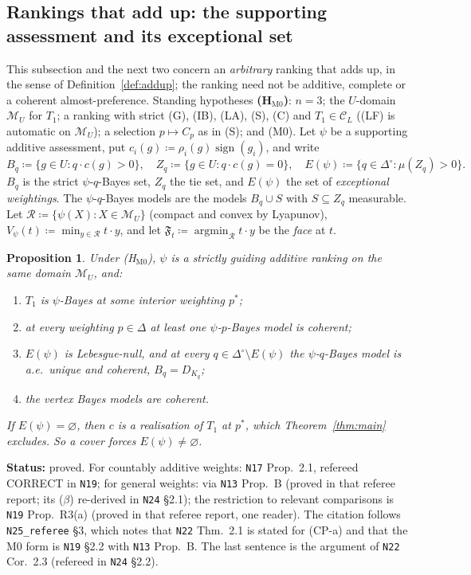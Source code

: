 \documentclass[11pt]{article}
\newtheorem{proposition}[theorem]{Proposition}
\theoremstyle{definition}
\theoremstyle{remark}
\newcommand{\Di}{\Delta^{\circ}}
\newcommand{\M}{\mathcal M}
\newcommand{\C}{\mathcal C}
\newcommand{\src}[1]{\texttt{#1}}
\newcommand{\status}[1]{\par\smallskip\noindent\textbf{Status:} #1\par\smallskip}
\begin{document}
\subsection{Rankings that add up: the supporting assessment and its exceptional set}\label{sec:M0}

This subsection and the next two concern an \emph{arbitrary} ranking that adds up, in the sense of Definition~\ref{def:addup}; the ranking need not be additive, complete or a coherent almost-preference. Standing hypotheses \textbf{(H$_{\mathrm{M0}}$)}: $n=3$; the $U$-domain $\M_U$ for $T_1$; a ranking with strict (G), (IB), (LA), (S), (C) and $T_1\in\C_L$ ((LF) is automatic on $\M_U$); a selection $p\mapsto C_p$ as in (S); and (M0). Let $\psi$ be a supporting additive assessment, put $c_i(g)\coloneqq\rho_i(g)\operatorname{sign}(g_i)$, and write
\[
B_q\coloneqq\{g\in U:q\cdot c(g)>0\},\quad Z_q\coloneqq\{g\in U:q\cdot c(g)=0\},\quad E(\psi)\coloneqq\{q\in\Di:\mu(Z_q)>0\}.
\]
$B_q$ is the strict $\psi$-$q$-Bayes set, $Z_q$ the tie set, and $E(\psi)$ the set of \emph{exceptional weightings}. The $\psi$-$q$-Bayes models are the models $B_q\cup S$ with $S\subseteq Z_q$ measurable. Let $\mathcal R\coloneqq\{\psi(X):X\in\M_U\}$ (compact and convex by Lyapunov), $V_\psi(t)\coloneqq\min_{y\in\mathcal R}t\cdot y$, and let $\mathfrak F_t\coloneqq\operatorname{argmin}_{\mathcal R}t\cdot y$ be the \emph{face} at $t$.

\begin{proposition}\label{prop:M0}
Under (H$_{\mathrm{M0}}$), $\psi$ is a strictly guiding additive ranking on the same domain $\M_U$, and:
\begin{enumerate}[leftmargin=*,label=($\alph*$)]
\item[($\alpha$)] $T_1$ is $\psi$-Bayes at some interior weighting $p^*$;
\item[($\beta$)] at \emph{every} weighting $p\in\Delta$ at least one $\psi$-$p$-Bayes model is coherent;
\item[($\gamma$)] $E(\psi)$ is Lebesgue-null, and at every $q\in\Di\setminus E(\psi)$ the $\psi$-$q$-Bayes model is a.e.\ unique and coherent, $B_q=D_{K_q}$;
\item[($\delta$)] the vertex Bayes models are coherent.
\end{enumerate}
If $E(\psi)=\varnothing$, then $c$ is a realisation of $T_1$ at $p^*$, which Theorem~\ref{thm:main} excludes. So a cover forces $E(\psi)\ne\varnothing$.
\end{proposition}
\status{proved. For countably additive weights: \src{N17} Prop.~2.1, refereed CORRECT in \src{N19}; for general weights: via \src{N13} Prop.~B (proved in that referee report; its ($\beta$) re-derived in \src{N24} \S2.1); the restriction to relevant comparisons is \src{N19} Prop.~R3(a) (proved in that referee report, one reader). The citation follows \src{N25\_referee} \S3, which notes that \src{N22} Thm.~2.1 is stated for (CP-a) and that the M0 form is \src{N19} \S2.2 with \src{N13} Prop.~B. The last sentence is the argument of \src{N22} Cor.~2.3 (refereed in \src{N24} \S2.2).}
\end{document}
